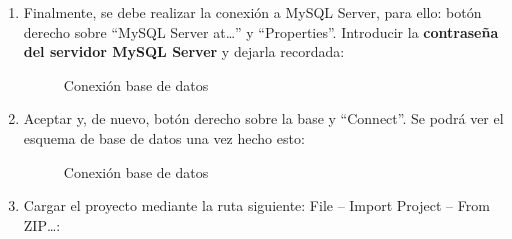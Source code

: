 \begin{enumerate}
\begin{figure} [!htb]
		\label{fig:server_3}
	\end{figure}
	\FloatBarrier
	\item Finalmente, se debe realizar la conexión a MySQL Server, para ello: botón derecho sobre ``MySQL Server at\dots'' y ``Properties''. Introducir la \textbf{contraseña del servidor MySQL Server} y dejarla recordada:
	\begin{figure} [!htb]
		\centering
		\caption{Conexión base de datos}
		\label{fig:server_4}
	\end{figure}
	\FloatBarrier
	\item Aceptar y, de nuevo, botón derecho sobre la base y ``Connect''. Se podrá ver el esquema de base de datos una vez hecho esto:
	\begin{figure} [!htb]
		\centering
		\caption{Conexión base de datos}
		\label{fig:server_5}
	\end{figure}
	\FloatBarrier
	\item Cargar el proyecto mediante la ruta siguiente: File -- Import Project -- From ZIP\dots:
	\begin{figure} [!htb]

\end{figure}
\end{enumerate}

